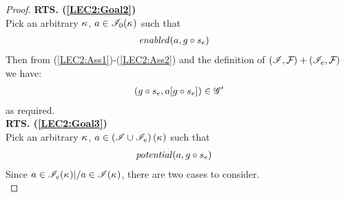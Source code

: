 \begin{lemma}
\begin{proof}
\noindent\textbf{RTS. (\ref{LEC2:Goal2})}\\
Pick an arbitrary $\kappa_{}$, $a \in \mathscr{I}_0(\kappa_{})$ such that
%
\begin{align}
	& \mathit{enabled}(a, g \circ s_e) \label{LEC2:Ass20}
\end{align}
Then from (\ref{LEC2:Ass1})-(\ref{LEC2:Ass2}) and the definition of $(\mathscr{I}, \mathcal{F}_{}) + (\mathscr{I}_e, \mathcal{F}_{})$ we have:
%
\begin{align*}
	(g \circ s_e, a[g \circ s_e]) \in \mathscr{G}'
\end{align*}
%
as required.\\
%
%
%

\noindent\textbf{RTS. (\ref{LEC2:Goal3})}\\
Pick an arbitrary $\kappa_{}$, $a \in \left(\mathscr{I} \cup \mathscr{I}_e\right)(\kappa_{})$ such that
%
\begin{align}
	& \mathit{potential}(a, g \circ s_e)  \label{LEC2:Ass25}
\end{align}
Since $a \in \mathscr{I}_e(\kappa_{}) |/  a \in\mathscr{I}(\kappa_{})$, there are two cases to consider. \\


\end{proof}
\end{lemma}
